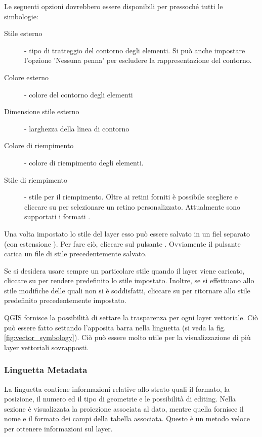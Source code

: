 Le seguenti opzioni dovrebbero essere disponibili per pressoché tutti le
simbologie:
\begin{description}
 \item[Stile esterno] - tipo di tratteggio del contorno degli elementi. Si può
 anche impostare l'opzione 'Nessuna penna' per escludere la rappresentazione
 del contorno.
 \item[Colore esterno] - colore del contorno degli elementi
 \item[Dimensione stile esterno] - larghezza della linea di contorno
 \item[Colore di riempimento] - colore di riempimento degli elementi.
 \item[Stile di riempimento] - stile per il riempimento. Oltre ai retini
 forniti è possibile scegliere 
 e cliccare su \browsebutton per selezionare un retino personalizzato.
 Attualmente sono
 supportati i formati .
\end{description}

Una volta impostato lo stile del layer esso può essere salvato in un fiel
separato (con estensione ).
Per fare ciò, cliccare sul pulsante . Ovviamente il
pulsante  carica un file di stile precedentemente
salvato.

Se si desidera usare sempre un particolare stile quando il layer viene
caricato, cliccare su  per rendere predefinito
lo stile impostato. Inoltre, se si effettuano allo stile modifiche delle quali
non si è soddisfatti, cliccare su  per
ritornare allo stile predefinito precedentemente impostato.

 \label{sec:vect_transparency} 
QGIS \CURRENT fornisce la possibilità di settare la trasparenza per ogni layer
vettoriale. Ciò può essere fatto settando l'apposita barra
 nella linguetta  (si veda la fig. \ref{fig:vector_symbology}).
Ciò può essere molto utile per la visualizzazione di più layer vettoriali
sovrapposti.

\subsubsection{Linguetta Metadata}

La linguetta  contiene informazioni relative allo strato quali il formato, la posizione, il
numero ed il tipo di geometrie e le possibilità di editing. Nella sezione
 è visualizzata la proiezione associata al
dato, mentre quella  fornisce il nome
e il formato dei campi della tabella associata. Questo è un metodo veloce per
ottenere informazioni sul layer.

